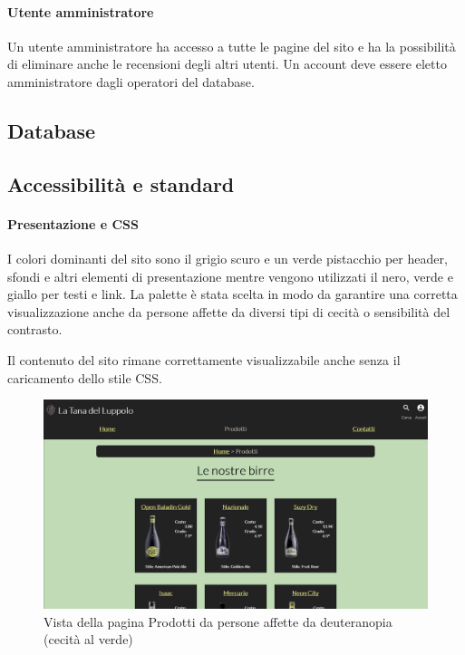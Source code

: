 \paragraph{Utente amministratore}
Un utente amministratore ha accesso a tutte le pagine del sito e ha la possibilità di eliminare anche le recensioni degli altri utenti.
Un account deve essere eletto amministratore dagli operatori del database.

\subsection{Database}
\subsection{Accessibilità e standard}

\paragraph{Presentazione e CSS}
I colori dominanti del sito sono il grigio scuro e un verde pistacchio per header, sfondi e altri elementi di presentazione mentre vengono utilizzati il nero, verde e giallo per testi e link.
La palette è stata scelta in modo da garantire una corretta visualizzazione anche da persone affette da diversi tipi di cecità o sensibilità del contrasto. 


Il contenuto del sito rimane correttamente visualizzabile anche senza il caricamento dello stile CSS.

\begin{figure}[H]
	\centering
	\includegraphics[width=16cm]{utility/prodotti_deuteranopia.png}
	\caption{Vista della pagina Prodotti da persone affette da deuteranopia (cecità al verde)}
\end{figure}

